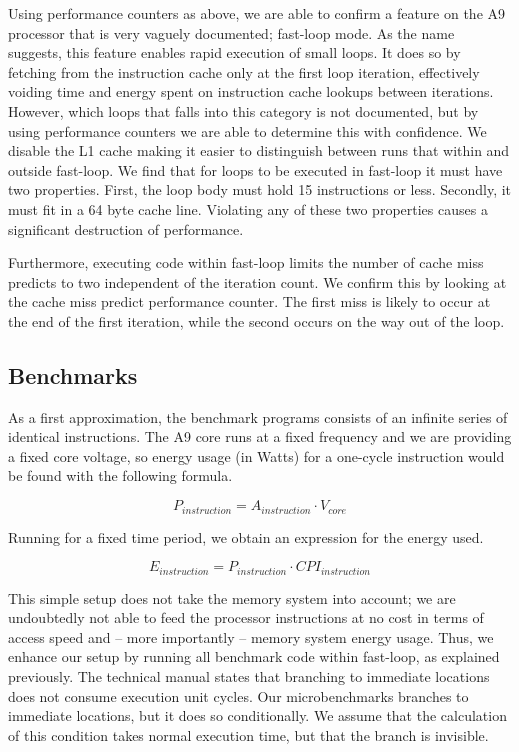 Using performance counters as above, we are able to confirm a feature on the A9
processor that is very vaguely documented; fast-loop\texttrademark{} mode. As
the name suggests, this feature enables rapid execution of small loops. It does
so by fetching from the instruction cache only at the first loop iteration,
effectively voiding time and energy spent on instruction cache lookups between
iterations. However, which loops that falls into this category is not
documented, but by using performance counters we are able to determine this with
confidence. We disable the L1 cache making it easier to distinguish between runs
that within and outside fast-loop. We find that for loops to be executed in
fast-loop it must have two properties. First, the loop body must hold 15
instructions or less. Secondly, it must fit in a 64 byte cache line. Violating
any of these two properties causes a significant destruction of performance.

Furthermore, executing code within fast-loop limits the number of cache
miss predicts to two independent of the iteration count. We confirm this by
looking at the cache miss predict performance counter. The first miss is likely to
occur at the end of the first iteration, while the second occurs on the way out
of the loop.

\subsection{Benchmarks}
As a first approximation, the benchmark programs consists of an infinite series
of identical instructions. The A9 core runs at a fixed frequency and we are
providing a fixed core voltage, so energy usage (in Watts) for a one-cycle
instruction would be found with the following formula.

\begin{equation}
    P_{instruction} = A_{instruction} \cdot V_{core}
\end{equation}

Running for a fixed time period, we obtain an expression for the energy used.

\begin{equation}
    E_{instruction} = P_{instruction} \cdot CPI_{instruction}
\end{equation}

This simple setup does not take the memory system into account; we are
undoubtedly not able to feed the processor instructions at no cost in terms of
access speed and -- more importantly -- memory system energy usage. Thus, we
enhance our setup by running all benchmark code within fast-loop, as explained
previously. The technical manual states that branching to immediate locations
does not consume execution unit cycles. Our microbenchmarks branches to
immediate locations, but it does so conditionally. We assume that the
calculation of this condition takes normal execution time, but that the branch
is invisible.

